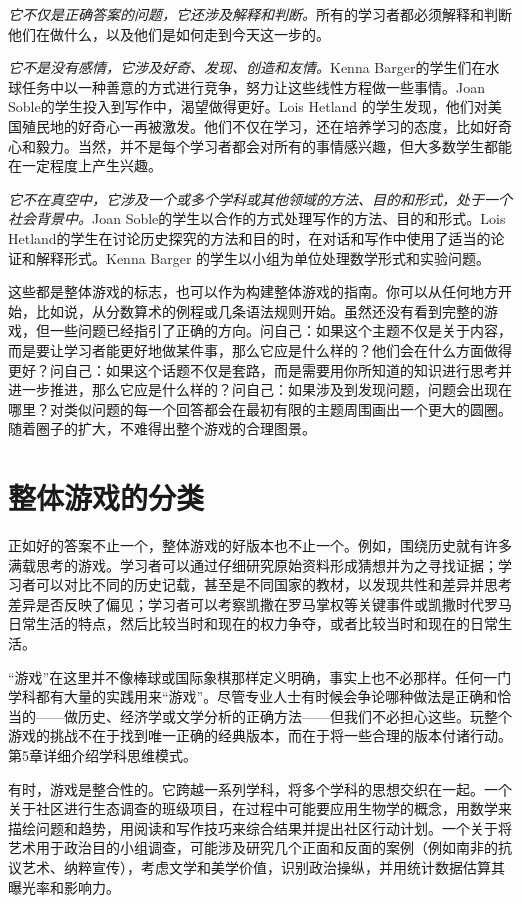 \textit{它不仅是正确答案的问题，它还涉及解释和判断。}所有的学习者都必须解释和判断他们在做什么，以及他们是如何走到今天这一步的。

\textit{它不是没有感情，它涉及好奇、发现、创造和友情。}Kenna Barger的学生们在水球任务中以一种善意的方式进行竞争，努力让这些线性方程做一些事情。Joan Soble的学生投入到写作中，渴望做得更好。Lois Hetland 的学生发现，他们对美国殖民地的好奇心一再被激发。他们不仅在学习，还在培养学习的态度，比如好奇心和毅力。当然，并不是每个学习者都会对所有的事情感兴趣，但大多数学生都能在一定程度上产生兴趣。

\textit{它不在真空中，它涉及一个或多个学科或其他领域的方法、目的和形式，处于一个社会背景中。}Joan Soble的学生以合作的方式处理写作的方法、目的和形式。Lois Hetland的学生在讨论历史探究的方法和目的时，在对话和写作中使用了适当的论证和解释形式。Kenna Barger 的学生以小组为单位处理数学形式和实验问题。

这些都是整体游戏的标志，也可以作为构建整体游戏的指南。你可以从任何地方开始，比如说，从分数算术的例程或几条语法规则开始。虽然还没有看到完整的游戏，但一些问题已经指引了正确的方向。问自己：如果这个主题不仅是关于内容，而是要让学习者能更好地做某件事，那么它应是什么样的？他们会在什么方面做得更好？问自己：如果这个话题不仅是套路，而是需要用你所知道的知识进行思考并进一步推进，那么它应是什么样的？问自己：如果涉及到发现问题，问题会出现在哪里？对类似问题的每一个回答都会在最初有限的主题周围画出一个更大的圆圈。随着圈子的扩大，不难得出整个游戏的合理图景。

\section*{整体游戏的分类}

正如好的答案不止一个，整体游戏的好版本也不止一个。例如，围绕历史就有许多满载思考的游戏。学习者可以通过仔细研究原始资料形成猜想并为之寻找证据；学习者可以对比不同的历史记载，甚至是不同国家的教材，以发现共性和差异并思考差异是否反映了偏见；学习者可以考察凯撒在罗马掌权等关键事件或凯撒时代罗马日常生活的特点，然后比较当时和现在的权力争夺，或者比较当时和现在的日常生活。

“游戏”在这里并不像棒球或国际象棋那样定义明确，事实上也不必那样。任何一门学科都有大量的实践用来“游戏”。尽管专业人士有时候会争论哪种做法是正确和恰当的——做历史、经济学或文学分析的正确方法——但我们不必担心这些。玩整个游戏的挑战不在于找到唯一正确的经典版本，而在于将一些合理的版本付诸行动。第5章详细介绍学科思维模式。

有时，游戏是整合性的。它跨越一系列学科，将多个学科的思想交织在一起。一个关于社区进行生态调查的班级项目，在过程中可能要应用生物学的概念，用数学来描绘问题和趋势，用阅读和写作技巧来综合结果并提出社区行动计划。一个关于将艺术用于政治目的小组调查，可能涉及研究几个正面和反面的案例（例如南非的抗议艺术、纳粹宣传），考虑文学和美学价值，识别政治操纵，并用统计数据估算其曝光率和影响力。

